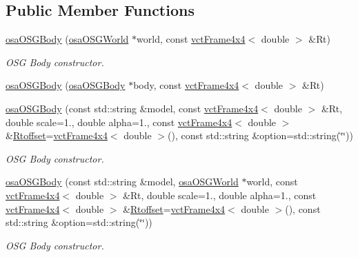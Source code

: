 \subsection*{Public Member Functions}
\begin{DoxyCompactItemize}
\item 
\hyperlink{classosa_o_s_g_body_a97c219501ee9a54f2ef495751a99254f}{osa\-O\-S\-G\-Body} (\hyperlink{classosa_o_s_g_world}{osa\-O\-S\-G\-World} $\ast$world, const \hyperlink{classvct_frame4x4}{vct\-Frame4x4}$<$ double $>$ \&Rt)
\begin{DoxyCompactList}\small\item\em O\-S\-G Body constructor. \end{DoxyCompactList}\item 
\hyperlink{classosa_o_s_g_body_a2ebb0bce287bdb02354eb1e44277073e}{osa\-O\-S\-G\-Body} (\hyperlink{classosa_o_s_g_body}{osa\-O\-S\-G\-Body} $\ast$body, const \hyperlink{classvct_frame4x4}{vct\-Frame4x4}$<$ double $>$ \&Rt)
\item 
\hyperlink{classosa_o_s_g_body_aec19a12554af6c42afb903ed1bd5a171}{osa\-O\-S\-G\-Body} (const std\-::string \&model, const \hyperlink{classvct_frame4x4}{vct\-Frame4x4}$<$ double $>$ \&Rt, double scale=1., double alpha=1., const \hyperlink{classvct_frame4x4}{vct\-Frame4x4}$<$ double $>$ \&\hyperlink{classosa_o_s_g_body_ad008984bdb0eda300948932eda13974a}{Rtoffset}=\hyperlink{classvct_frame4x4}{vct\-Frame4x4}$<$ double $>$(), const std\-::string \&option=std\-::string(\char`\"{}\char`\"{}))
\begin{DoxyCompactList}\small\item\em O\-S\-G Body constructor. \end{DoxyCompactList}\item 
\hyperlink{classosa_o_s_g_body_a358379da09846c1782ef1be224e8f828}{osa\-O\-S\-G\-Body} (const std\-::string \&model, \hyperlink{classosa_o_s_g_world}{osa\-O\-S\-G\-World} $\ast$world, const \hyperlink{classvct_frame4x4}{vct\-Frame4x4}$<$ double $>$ \&Rt, double scale=1., double alpha=1., const \hyperlink{classvct_frame4x4}{vct\-Frame4x4}$<$ double $>$ \&\hyperlink{classosa_o_s_g_body_ad008984bdb0eda300948932eda13974a}{Rtoffset}=\hyperlink{classvct_frame4x4}{vct\-Frame4x4}$<$ double $>$(), const std\-::string \&option=std\-::string(\char`\"{}\char`\"{}))
\begin{DoxyCompactList}\small\item\em O\-S\-G Body constructor. \end{DoxyCompactList}\item 

\end{DoxyCompactItemize}
